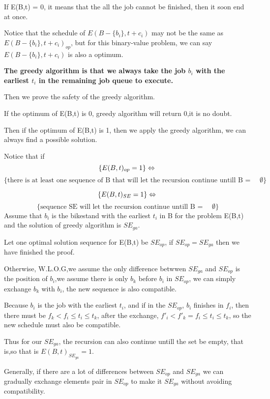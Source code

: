 \documentclass[oneside]{homework} %
\begin{document}
If E(B,t) = 0, it means that the all the job cannot be finished, then it soon end at once.

Notice that the schedule of $E(B-\{b_{i}\},t+c_{i})$ may not be the same as $E(B-\{b_{i}\},t+c_{i})_{op}$, but for this binary-value problem, we can say $E(B-\{b_{i}\},t+c_{i})$ is also a optimum.


\textbf{The greedy algorithm is that we always take the job $b_{i}$ with the earliest $t_{i}$ in the remaining job queue to execute. }

Then we prove the safety of the greedy algorithm.

If the optimum of E(B,t) is 0, greedy algorithm will return 0,it is no doubt.

Then if the optimum of E(B,t) is 1, then we apply the greedy algorithm, we can always find a possible solution.

Notice that if 
$$\{E(B,t)_{op} = 1\} \Leftrightarrow \\ $$
$$\{ \text{there is at least one sequence of B that will let the recursion continue untill B  = } \quad \emptyset \}$$ 

$$\{E(B,t)_{SE} = 1\} \Leftrightarrow \\ $$
$$\{\text{sequence SE will let the recursion continue untill B  = } \quad \emptyset \}$$ 
Assume that $b_{i}$ is the bikestand with the earliest $t_{i}$ in B for the problem E(B,t) and the solution of greedy algorithm is $SE_{ga}$.  

Let one optimal solution sequence for E(B,t) be $SE_{op}$, if $SE_{op} = SE_{ga}$ then we have finished the proof. 

Otherwise, W.L.O.G,we assume the only difference betwwen $SE_{ga}$ and $SE_{op}$ is the position of $b_{i}$,we assume there is only $b_{k}$ before $b_{i}$ in $SE_{op}$, we can simply exchange $b_{k}$ with $b_{i}$, the new sequence is also compatible. 

Because $b_{i}$ is the job with the earliest $t_{i}$, and if in the $SE_{op}$, $b_{i}$ finishes in $f_{i}$, then there must be $f_{k} < f_{i} \leq t_{i} \leq t_{k}$, after the exchange, $f'_{i}<f'_{k} =  f_{i} \leq t_{i} \leq t_{k}$, so the new schedule must also be compatible.

Thus for our $SE_{ga}$, the recursion can also continue untill the set be empty, that is,so that is $E(B,t)_{SE_{ga}} = 1$.

Generally, if there are a lot of differences between $SE_{op}$ and  $SE_{ga}$ we can gradually exchange elements pair in $SE_{op}$ to make it $SE_{ga}$ without avoiding compatibility. 
\end{document}
